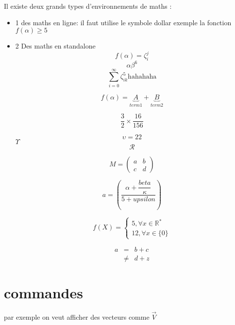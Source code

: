 \documentclass[a4paper, 10pt]{article}
\begin{document}
\begin{multicols}{2}
Il existe deux grands types d'environnements de maths :
\begin{itemize}
\item 1
des maths en ligne:  il faut utilise le symbole dollar
exemple la fonction $f(\alpha) \geq 5$
\item 2
Des maths en standalone
$$
f(\alpha)=\zeta_i^j
$$
$$
{\alpha \beta }^6
$$
$$
\sum_{i=0}^\infty \zeta_{ik}^5
\mbox{hahahaha} %
$$

$$
f(\alpha)=\underbrace{A}_{term1} +\underbrace{B}_{term2}
$$

$$
\frac{3}{2} \times \frac{16}{156} 
$$

\begin{equation}
\upsilon=22
\label{eq:fractions}
\end{equation}
$\Upsilon$
$$
\mathcal R %
$$

\begin{equation}
M=
\begin{pmatrix}

a & b \\
c & d
\end{pmatrix}
\end{equation}

$$
a=
\left(
\dfrac{\alpha + \dfrac{beta}{\kappa}}{5+upsilon}
\right)
$$

$$
f(X)=
\left\lbrace
\begin{split}
5, \forall x \in \mathbb R^*\\
12, \forall x \in \lbrace 0 \rbrace
\end{split}
\right. %
$$

\begin{eqnarray}
a & =    & b + c\\
  & \neq & d + z
\end{eqnarray}



\end{itemize}




\section{commandes}
\newcommand{\myvec}[1]{\vec #1} %
par exemple on veut afficher des vecteurs comme $\myvec V$



\end{multicols}
\end{document}

